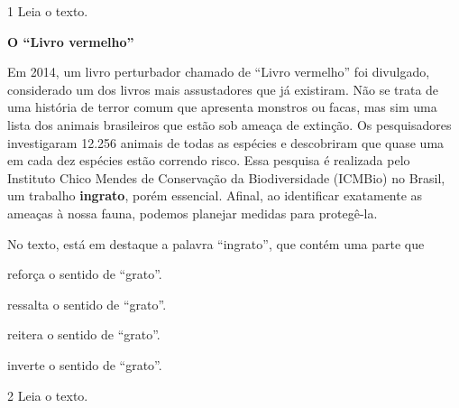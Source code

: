 \vspace*{-3.4cm}

\num{1} Leia o texto.

\begin{myquote}
\textbf{O ``Livro vermelho''}

Em 2014, um livro perturbador chamado de ``Livro vermelho'' foi divulgado, considerado um dos livros mais assustadores que já existiram. Não se trata de uma história de terror comum que apresenta monstros ou facas, mas sim uma lista dos animais brasileiros que estão sob ameaça de extinção. Os pesquisadores investigaram 12.256 animais de todas as espécies e descobriram que quase uma em cada dez espécies estão correndo risco. Essa pesquisa é realizada pelo Instituto Chico Mendes de Conservação da Biodiversidade (ICMBio) no Brasil, um trabalho \textbf{ingrato}, porém essencial. Afinal, ao identificar exatamente as ameaças à nossa fauna, podemos planejar medidas para protegê-la.

\end{myquote}

No texto, está em destaque a palavra ``ingrato'', que contém uma parte que

\begin{escolha}
\item reforça o sentido de ``grato''.

\item ressalta o sentido de ``grato''.

\item reitera o sentido de ``grato''.

\item inverte o sentido de ``grato''.
\end{escolha}

\num{2} Leia o texto.

